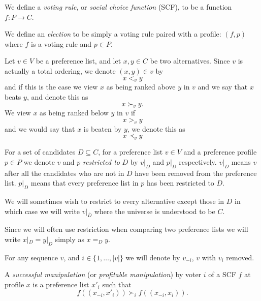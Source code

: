 	\begin{definition}
		We define a \emph{voting rule}, or \emph{social choice function} (SCF), to be a function $f : P \to C$.
	\end{definition}

	\begin{definition}
		We define an \emph{election} to be simply a voting rule paired with a profile: $(f, p)$ where $f$ is a voting rule and $p \in P$.
	\end{definition}

	\begin{definition}
		Let $v \in V$ be a preference list, and let $x, y \in C$ be two alternatives. Since $v$ is actually a total ordering, we denote $(x, y) \in v$ by
		\[
			x <_v y
		\]
		and if this is the case we view $x$ as being ranked above $y$ in $v$ and we say that $x$ beats $y$, and denote this as
		\[
			x \succ_v y.
		\]
		We view $x$ as being ranked below $y$ in $v$ if
		\[
			x >_v y
		\]
		and we would say that $x$ is beaten by $y$, we denote this as
		\[
			x \prec_v y
		\]
	\end{definition}

	\begin{definition}
		\label{preference-restriction-definition}
		For a set of candidates $D \subseteq C$, for a preference list $v \in V$ and a preference profile $p \in P$ we denote $v$ and $p$ \emph{restricted to} $D$ by $v|_D$ and $p|_D$ respectively. $v|_D$ means $v$ after all the candidates who are not in $D$ have been removed from the preference list. $p|_D$ means that every preference list in $p$ has been restricted to $D$.

		We will sometimes wish to restrict to every alternative except those in $D$ in which case we will write $v|_{\overline{D}}$ where the universe is understood to be $C$.

		Since we will often use restriction when comparing two preference lists we will write $x|_D = y|_D$ simply as $x =_D y$.
	\end{definition}

	\begin{definition}
		For any sequence $v$, and $i \in \{1, \ldots, |v|\}$ we will denote by $v_{-i}$, $v$ with $v_i$ removed.
	\end{definition}

	\begin{definition}
		\label{manipulation-definition}
		A \emph{successful manipulation} (or \emph{profitable manipulation}) by voter $i$ of a SCF $f$ at profile $x$ is a preference list $x'_i$ such that
		\[
			f((x_{-i}, x'_i)) \succ_i f((x_{-i}, x_i)).
		\]
	\end{definition}
